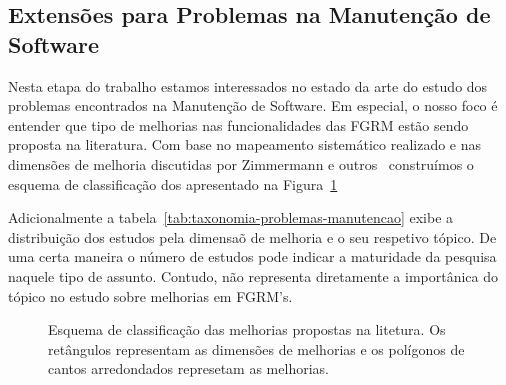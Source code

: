 \subsection{Extensões para Problemas na Manutenção de Software}
\label{sub:extensões_para_problemas_na_manutenção_de_software}

Nesta etapa do trabalho estamos interessados no estado da arte do estudo dos
problemas encontrados na Manutenção de Software. Em especial, o nosso foco é
entender que tipo de melhorias nas funcionalidades das FGRM estão sendo proposta
na literatura. Com base no mapeamento sistemático realizado e nas dimensões de
melhoria discutidas por Zimmermann e outros~\cite{5070993} construímos o esquema
de classificação dos apresentado na
Figura~\ref{fig:diagrama-esquema-dimensao-melhorias}

Adicionalmente a tabela~\ref{tab:taxonomia-problemas-manutencao} exibe a
distribuição dos estudos pela dimensaõ de melhoria e o seu respetivo tópico. De
uma certa maneira o número de estudos  pode indicar a maturidade da pesquisa
naquele tipo de assunto. Contudo, não representa diretamente a importânica do
tópico no estudo sobre melhorias em FGRM's.



\begin{figure}[tb]
\centering
\caption{Esquema de classificação das melhorias propostas na litetura. Os
	retângulos representam as dimensões de melhorias e os polígonos de cantos
	arredondados represetam as melhorias.}
\label{fig:diagrama-esquema-dimensao-melhorias}
\end{figure}

